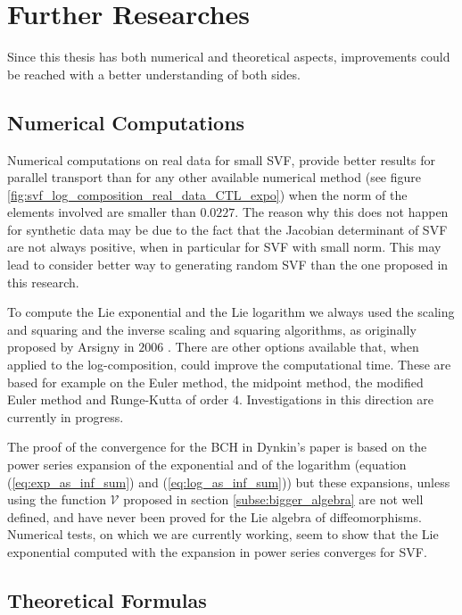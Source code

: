 \section{Further Researches}\label{se:further_research}

Since this thesis has both numerical and theoretical aspects, improvements could be reached with a better understanding of both sides.

\subsection{Numerical Computations} 

Numerical computations on real data for small SVF, provide better results for parallel transport than for any other available numerical method (see figure \ref{fig:svf_log_composition_real_data_CTL_expo}) when the norm of the elements involved are smaller than $0.0227$. The reason why this does not happen for synthetic data may be due to the fact that the Jacobian determinant of SVF are not always positive, when in particular for SVF with small norm. This may lead to consider better way to generating random SVF than the one proposed in this research. 

To compute the Lie exponential and the Lie logarithm we always used the scaling and squaring and the inverse scaling and squaring algorithms, as originally proposed by Arsigny in $2006$ \cite{arsigny2006log}. There are other options available that, when applied to the log-composition, could improve the computational time. These are based for example on the Euler method, the midpoint method, the modified Euler method and Runge-Kutta of order $4$. Investigations in this direction are currently in progress.

The proof of the convergence for the BCH in Dynkin's paper is based on the power series expansion of the exponential and of the logarithm (equation (\ref{eq:exp_as_inf_sum}) and (\ref{eq:log_as_inf_sum}))
but these expansions, unless using the function $\mathcal{V}$ proposed in section \ref{subse:bigger_algebra} are not well defined, and have never been proved for the Lie algebra of diffeomorphisms.
Numerical tests, on which we are currently working, seem to show that the Lie exponential computed with the expansion in power series converges for SVF.

\subsection{Theoretical Formulas}

